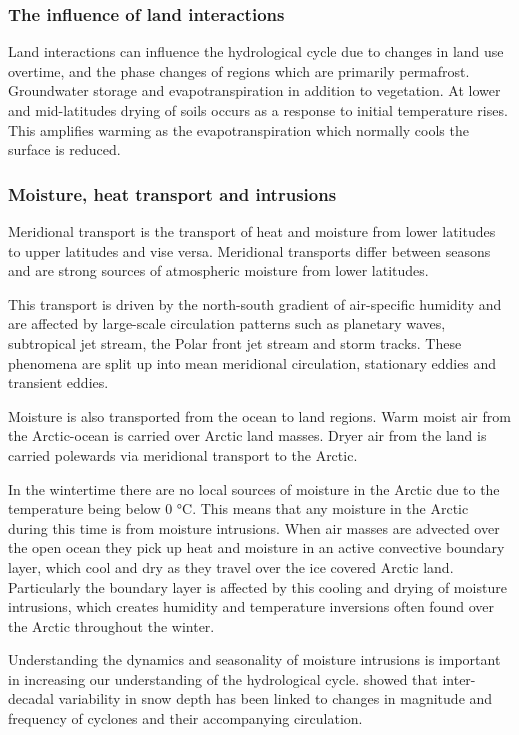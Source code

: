 \documentclass[12pt, oneside]{article}
\begin{document}
\subsubsection{The influence of land interactions}
Land interactions can influence the hydrological cycle due to changes in land use overtime, and the phase changes of regions which are primarily permafrost. Groundwater storage and evapotranspiration in addition to vegetation. At lower and mid-latitudes drying of soils occurs as a response to initial temperature rises. This amplifies warming as the evapotranspiration which normally cools the surface is reduced\cite{Goosse2018}. 


\subsubsection{Moisture, heat transport and intrusions}\label{moisture_intrusions}

Meridional transport is the transport of heat and moisture from lower latitudes to upper latitudes and vise versa. Meridional transports differ between seasons and are strong sources of atmospheric moisture from lower latitudes. 

This transport is driven by the north-south gradient of air-specific humidity and are affected by large-scale circulation patterns such as planetary waves, subtropical jet stream, the Polar front jet stream and storm tracks\cite{gimeno2019atmospheric}. These phenomena are split up into mean meridional circulation, stationary eddies and transient eddies.  

Moisture is also transported from the ocean to land regions. Warm moist air from the Arctic-ocean is carried over Arctic land masses. Dryer air from the land is carried polewards via meridional transport to the Arctic. 

In the wintertime there are no local sources of moisture in the Arctic due to the temperature being below 0 °C. This means that any moisture in the Arctic during this time is from moisture intrusions. When air masses are advected over the open ocean they pick up heat and moisture in an active convective boundary layer, which cool and dry as they travel over the ice covered Arctic land. Particularly the boundary layer is affected by this cooling and drying of moisture intrusions, which creates humidity and temperature inversions often found over the Arctic throughout the winter\cite{ali2020following}. 

Understanding the dynamics and seasonality of moisture intrusions is important in increasing our understanding of the hydrological cycle. \cite{webster2019role} showed that inter-decadal variability in snow depth has been linked to changes in magnitude and frequency of cyclones and their accompanying circulation.
\end{document}
